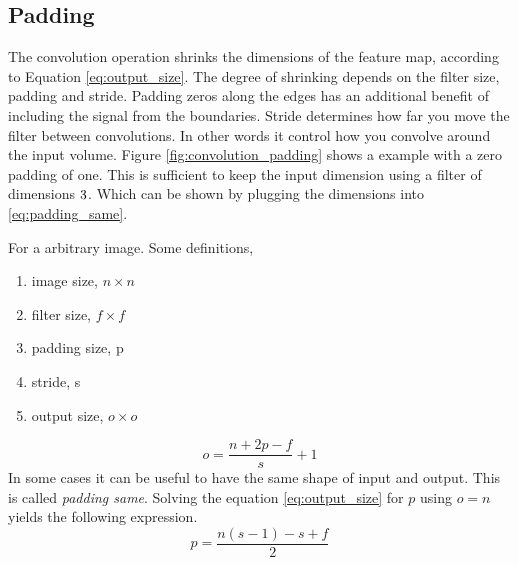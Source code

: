 \subsection{Padding} \label{sec:padding}
The convolution operation shrinks the dimensions of the feature map, according to Equation \eqref{eq:output_size}. The degree of shrinking  depends on the  filter size, padding and stride. Padding zeros along the edges has an additional benefit of including the signal from the boundaries. Stride determines how far you move the filter between convolutions. In other words it control how you convolve around the input volume. Figure \ref{fig:convolution_padding} shows a example with a zero padding of one. This is sufficient to keep the input dimension using a filter of dimensions $3 \time 3$. Which can be shown by plugging the dimensions into \eqref{eq:padding_same}.

For a arbitrary image. Some definitions,
\begin{enumerate}
    \item image size, $n\times n$
    \item filter size, $f\times f$
    \item padding size, p
    \item stride, s
    \item output size, $o \times o$
\end{enumerate}

\begin{equation} \label{eq:output_size}
    o = \frac{n+2p-f}{s} + 1
\end{equation}
In some cases it can be useful to have the same shape of input and output. This is called \textit{padding same}. Solving the equation \eqref{eq:output_size} for $p$ using $o=n$ yields the following expression.
\begin{equation} \label{eq:padding_same}
    p = \frac{n\left(s-1\right)-s+f}{2}
\end{equation}


